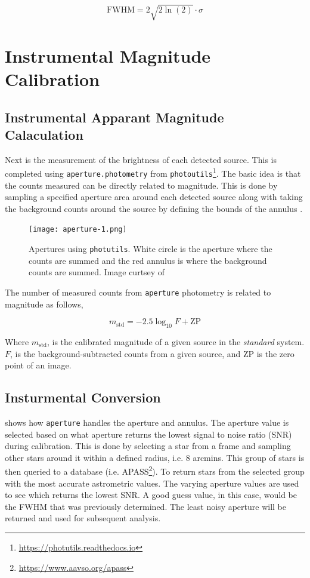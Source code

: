 \begin{equation}
    \text{FWHM} = 2\sqrt{2 \ln(2)} \cdot  \sigma 
\end{equation}

\section{Instrumental Magnitude Calibration}
\subsection{Instrumental Apparant Magnitude Calaculation}

Next is the measurement of the brightness of each detected source. This is completed using \verb|aperture.photometry| from \verb|photoutils|\footnote{\url{https://photutils.readthedocs.io}}. The basic idea is that the counts measured can be directly related to magnitude. This is done by sampling a specified aperture area around each detected source along with taking the background counts around the source by defining the bounds of the annulus \citep{larry_bradley_2020_4044744}. 

\begin{figure}[h!]
    \centering 
    \texttt{[image: aperture-1.png]}
    \caption{Apertures using \texttt{photutils}. White circle is the aperture where the counts are summed and the red annulus is where the background counts are summed. Image curtsey of \cite{larry_bradley_2020_4044744}}
    \label{fig: aperture}
\end{figure}

The number of measured counts from \verb|aperture| photometry is related to magnitude as follows, 

\begin{equation}
    m_{\text{std}} = -2.5 \log_{10} F + \text{ZP}
    \label{eq: magnitude}
\end{equation}

Where $m_{\text{std}}$, is the calibrated magnitude of a given source in the \textit{standard} system. $F$, is the background-subtracted counts from a given source, and ZP is the zero point of an image. 

\subsection{Insturmental Conversion}

 shows how \verb|aperture| handles the aperture and annulus. The aperture value is selected based on what aperture returns the lowest signal to noise ratio (SNR) during calibration. This is done by selecting a star from a frame and sampling other stars around it within a defined radius, i.e. 8 arcmins. This group of stars is then queried to a database (i.e. APASS\footnote{\url{https://www.aavso.org/apass}}). To return stars from the selected group with the most accurate astrometric values. The varying aperture values are used to see which returns the lowest SNR. A good guess value, in this case, would be the FWHM that was previously determined. The least noisy aperture will be returned and used for subsequent analysis. \\

